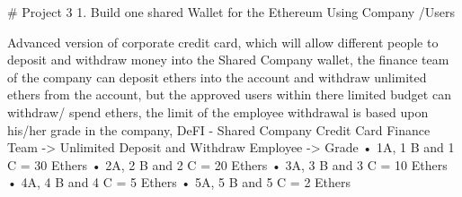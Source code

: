 # Project 3 
1.	Build one shared Wallet for the Ethereum Using Company /Users 

Advanced version of corporate credit card, which will allow different people to deposit and withdraw money into the Shared Company wallet, the finance team of the company can deposit ethers into the account and withdraw unlimited ethers from the account, but the approved users within there limited budget can withdraw/ spend ethers, the limit of the employee withdrawal is based upon his/her grade in the company, 
DeFI - Shared Company Credit Card 
Finance Team -> Unlimited Deposit and Withdraw 
Employee -> Grade 
•	1A, 1 B and 1 C = 30 Ethers 
•	2A, 2 B and 2 C = 20 Ethers 
•	3A, 3 B and 3 C = 10 Ethers 
•	4A, 4 B and 4 C = 5 Ethers 
•	5A, 5 B and 5 C = 2 Ethers 

